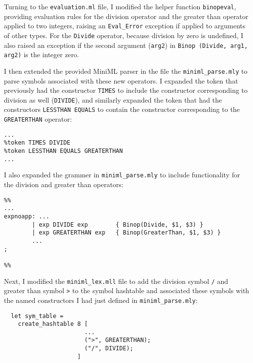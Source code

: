 \documentclass[12pt]{extarticle}
\begin{document}
\vspace{0.3cm}
Turning to the \texttt{evaluation.ml} file, I modified the helper function \texttt{binopeval}, providing evaluation rules for the division operator and the greater than operator applied to two integers, raising an \texttt{Eval_Error} exception if applied to arguments of other types. For the \texttt{Divide} operator, because division by zero is undefined, I also raised an exception if the second argument (\texttt{arg2}) in \texttt{Binop (Divide, arg1, arg2)} is the integer zero.

\vspace{0.3cm}
I then extended the provided MiniML parser in the file the \texttt{miniml_parse.mly} to parse symbols associated with these new operators. I expanded the token that previously had the constructor \texttt{TIMES} to include the constructor corresponding to division as well (\texttt{DIVIDE}), and similarly expanded the token that had the constructors \texttt{LESSTHAN EQUALS} to contain the constructor corresponding to the \texttt{GREATERTHAN} operator:

\footnotesize
\begin{verbatim}
...
%token TIMES DIVIDE
%token LESSTHAN EQUALS GREATERTHAN
...
\end{verbatim}

\vspace{0.3cm}
\normalsize
I also expanded the grammer in \texttt{miniml_parse.mly} to include functionality for the division and greater than operators:

\footnotesize
\begin{verbatim}
%%
...
expnoapp: ...
        | exp DIVIDE exp        { Binop(Divide, $1, $3) }
        | exp GREATERTHAN exp   { Binop(GreaterThan, $1, $3) }
        ...
;

%%
\end{verbatim}

\normalsize
Next, I modified the \texttt{miniml_lex.mll} file to add the division symbol \texttt{/} and greater than symbol \texttt{>} to the symbol hashtable and associated these symbols with the named constructors I had just defined in \texttt{miniml_parse.mly}:

\footnotesize
\begin{verbatim}
  let sym_table = 
    create_hashtable 8 [
                       ...
                       (">", GREATERTHAN);
                       ("/", DIVIDE);
                     ]
\end{verbatim}
\end{document}
